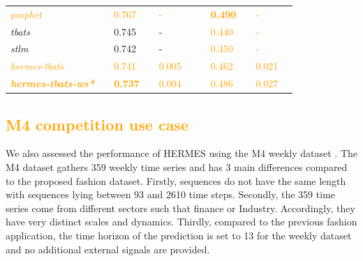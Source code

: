 \documentclass[10pt]{article} %
\begin{document}
\begin{table}
{\begin{tabular}{l||lllll|lllll}
     \textcolor{orange}{\textit{prophet}} && \textcolor{orange}{0.767} && \textcolor{orange}{-} &&& \textcolor{orange}{\textbf{0.490}} && \textcolor{orange}{-} &\\
     \textit{tbats} && 0.745 && - &&& \textcolor{orange}{0.440} && \textcolor{orange}{-} &\\
     \textit{stlm} && 0.742 && - &&& \textcolor{orange}{0.450} && \textcolor{orange}{-} &\\
     \textcolor{orange}{\textit{hermes-tbats}} && \textcolor{orange}{0.741} && \textcolor{orange}{0.005} &&& \textcolor{orange}{0.462} && \textcolor{orange}{0.021} &\\
     \textcolor{orange}{\textbf{\textit{hermes-tbats-ws*}}} && \textcolor{orange}{\textbf{0.737}} && \textcolor{orange}{0.004} &&& \textcolor{orange}{0.486} && \textcolor{orange}{0.027} &\\
  \end{tabular}
 }
\label{tab:1000metricresults}
\end{table}


\textcolor{orange}{\subsection{M4 competition use case}}
\label{sec:m4result}

We also assessed the performance of HERMES using the M4 weekly dataset \citep{makridakis2020}. The M4 dataset gathers 359 weekly time series and has 3 main differences compared to the proposed fashion dataset. Firstly, sequences do not have the same length with sequences lying between 93 and 2610 time steps. Secondly, the 359 time series come from different sectors such that finance or Industry. Accordingly, they have very distinct scales and dynamics. Thirdly, compared to the previous fashion application, the time horizon of the prediction is set to 13 for the weekly dataset and no additional external signals are provided.
\end{document}
